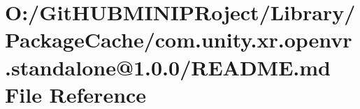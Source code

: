\hypertarget{_library_2_package_cache_2com_8unity_8xr_8openvr_8standalone_0D1_80_80_2_r_e_a_d_m_e_8md}{}\section{O\+:/\+Git\+H\+U\+B\+M\+I\+N\+I\+P\+Roject/\+Library/\+Package\+Cache/com.unity.\+xr.\+openvr.\+standalone@1.0.0/\+R\+E\+A\+D\+ME.md File Reference}
\label{_library_2_package_cache_2com_8unity_8xr_8openvr_8standalone_0D1_80_80_2_r_e_a_d_m_e_8md}
